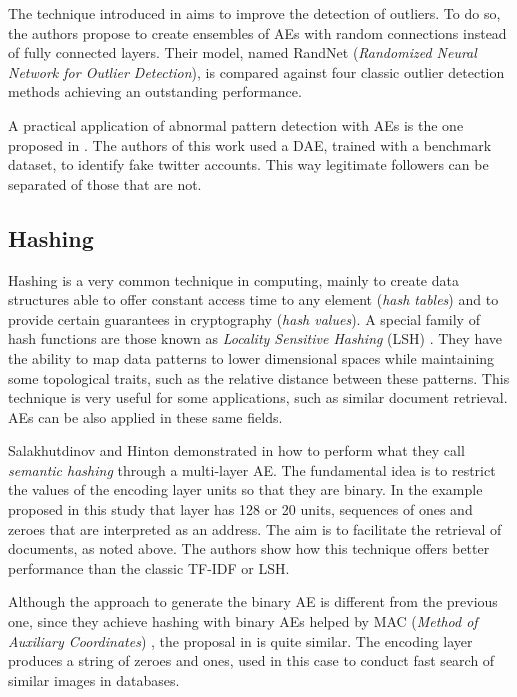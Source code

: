 The technique introduced in \cite{Chen2017OutlierDW} aims to improve the detection of outliers. To do so, the authors propose to create ensembles of AEs with random connections instead of fully connected layers. Their model, named RandNet (\textit{Randomized Neural Network for Outlier Detection}), is compared against four classic outlier detection methods achieving an outstanding performance.

A practical application of abnormal pattern detection with AEs is the one proposed in \cite{Castellini2017}. The authors of this work used a DAE, trained with a benchmark dataset, to identify fake twitter accounts. This way legitimate followers can be separated of those that are not.

\subsection{Hashing}\label{Sect.Hashing}
Hashing \cite{HashingReview2017} is a very common technique in computing, mainly to create data structures able to offer constant access time to any element (\textit{hash tables}) and to provide certain guarantees in cryptography (\textit{hash values}). A special family of hash functions are those known as \textit{Locality Sensitive Hashing} (LSH) \cite{LSH}. They have the ability to map data patterns to lower dimensional spaces while maintaining some topological traits, such as the relative distance between these patterns. This technique is very useful for some applications, such as similar document retrieval. AEs can be also applied in these same fields.

Salakhutdinov and Hinton demonstrated in \cite{SemanticHashing} how to perform what they call \textit{semantic hashing} through a multi-layer AE. The fundamental idea is to restrict the values of the encoding layer units so that they are binary. In the example proposed in this study that layer has 128 or 20 units, sequences of ones and zeroes that are interpreted as an address. The aim is to facilitate the retrieval of documents, as noted above. The authors show how this technique offers better performance than the classic TF-IDF \cite{TFIDF} or LSH.

Although the approach to generate the binary AE is different from the previous one, since they achieve hashing with binary AEs helped by MAC (\textit{Method of Auxiliary Coordinates}) \cite{MethodAuxiliaryCoordinates}, the proposal in \cite{carreira-perpinan_hashing_2015} is quite similar. The encoding layer produces a string of zeroes and ones, used in this case to conduct fast search of similar images in databases.

